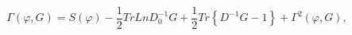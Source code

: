 \begin{equation}
\Gamma(\varphi,G)=S(\varphi)-\frac{1}{2}TrLnD_{0}^{-1}G+\frac{1}%
{2}Tr\left\{  D^{-1}G-1\right\}  +\Gamma^{2}(\varphi,G), \label{gammae}%
\end{equation}

